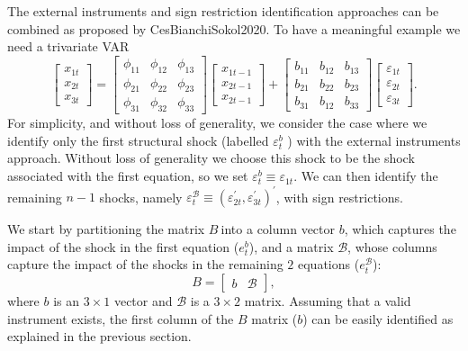 \documentclass[10pt]{article}
\begin{document}
The external instruments and sign restriction identification approaches can
be combined as proposed by CesBianchiSokol2020. To have a meaningful example
we need a trivariate VAR%
\begin{equation}
\left[ 
\begin{array}{c}
x_{1t} \\ 
x_{2t} \\ 
x_{3t}%
\end{array}%
\right] =%
\begin{bmatrix}
\phi _{11} & \phi _{12} & \phi _{13} \\ 
\phi _{21} & \phi _{22} & \phi _{23} \\ 
\phi _{31} & \phi _{32} & \phi _{33}%
\end{bmatrix}%
\left[ 
\begin{array}{c}
x_{1t-1} \\ 
x_{2t-1} \\ 
x_{2t-1}%
\end{array}%
\right] +\left[ 
\begin{array}{ccc}
b_{11} & b_{12} & b_{13} \\ 
b_{21} & b_{22} & b_{23} \\ 
b_{31} & b_{12} & b_{33}%
\end{array}%
\right] 
\begin{bmatrix}
\varepsilon _{1t} \\ 
\varepsilon _{2t} \\ 
\varepsilon _{3t}%
\end{bmatrix}%
.  \label{eq:struct_var_sriv}
\end{equation}%
For simplicity, and without loss of generality, we consider the case where
we identify only the first structural shock (labelled $\varepsilon _{t}^{b}$%
) with the external instruments approach. Without loss of generality we
choose this shock to be the shock associated with the first equation, so we
set $\varepsilon _{t}^{b}\equiv \varepsilon _{1t}$. We can then identify the
remaining $n-1$ shocks, namely $\varepsilon _{t}^{\mathcal{B}}\equiv
(\varepsilon _{2t}^{\prime },\varepsilon _{3t}^{\prime })^{\prime }$, with
sign restrictions.

We start by partitioning the matrix $B\ $into a column vector $b$, which
captures the impact of the shock in the first equation ($e_{t}^{b}$), and a
matrix $\mathcal{B}$, whose columns capture the impact of the shocks in the
remaining $2$ equations ($e_{t}^{\mathcal{B}}$):%
\begin{equation}
B=\left[ 
\begin{array}{cc}
b & \mathcal{B}%
\end{array}%
\right] ,  \label{eq:B_partitioned}
\end{equation}%
where $b$ is an $3\times 1$ vector and $\mathcal{B}$ is a $3\times 2$
matrix. Assuming that a valid instrument exists, the first column of the $B$
matrix ($b$) can be easily identified as explained in the previous section.
\end{document}
